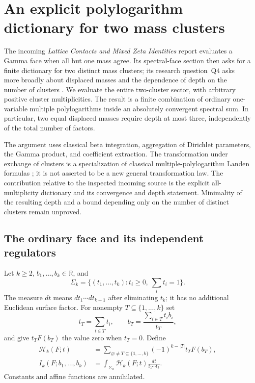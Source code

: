 
\section{An explicit polylogarithm dictionary for two mass clusters}
\label{tc:sec:clusters}

The incoming \emph{Lattice Contacts and Mixed Zeta Identities} report
evaluates a Gamma face when all but one mass agree.  Its spectral-face
section then asks for a finite dictionary for two distinct mass
clusters; its research question~Q4 asks more broadly about displaced
masses and the dependence of depth on the number of clusters
\cite{repolattice}.  We evaluate the entire two-cluster sector,
with arbitrary positive cluster multiplicities.  The result is a
finite combination of ordinary one-variable multiple polylogarithms
inside an absolutely convergent spectral sum.  In particular, two
equal displaced masses require depth at most three, independently
of the total number of factors.

The argument uses classical beta integration, aggregation of Dirichlet
parameters, the Gamma product, and coefficient extraction.  The
transformation under exchange of clusters is a specialization of
classical multiple-polylogarithm Landen formulas
\cite{okudaueno}; it is not asserted to be a new general
transformation law.  The contribution relative to the inspected
incoming source is the explicit all-multiplicity dictionary and its
convergence and depth statement.  Minimality of the resulting depth
and a bound depending only on the number of distinct clusters remain
unproved.

\subsection{The ordinary face and its independent regulators}

Let $k\ge2$, $b_1,\ldots,b_k\in\mathbb R$, and
\[
 \Sigma_k=\{(t_1,\ldots,t_k):t_i\ge0,\ \sum_i t_i=1\}.
\]
The measure $dt$ means $dt_1\cdots dt_{k-1}$ after eliminating
$t_k$; it has no additional Euclidean surface factor.  For nonempty
$T\subseteq\{1,\ldots,k\}$ set
\[
 t_T=\sum_{i\in T}t_i,\qquad
 b_T=\frac{\sum_{i\in T}t_i b_i}{t_T},
\]
and give $t_TF(b_T)$ the value zero when $t_T=0$.  Define
\begin{align}
 \mathcal H_k(F;t)
  &=\sum_{\varnothing\ne T\subseteq\{1,\ldots,k\}}
       (-1)^{k-|T|}t_TF(b_T),\label{tc:eq:face-integrand}\\
 I_k(F;b_1,\ldots,b_k)
  &=\int_{\Sigma_k}\mathcal H_k(F;t)
                    \frac{dt}{t_1\cdots t_k}.
                    \label{tc:eq:ordinary-face}
\end{align}
Constants and affine functions are annihilated.

